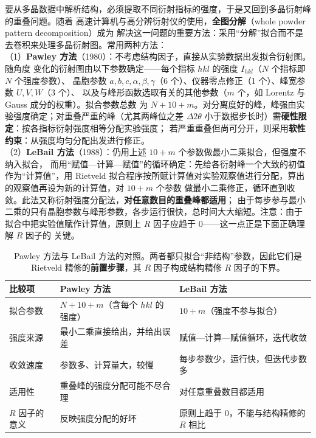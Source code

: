 \begin{principle}
要从多晶数据中解析结构，必须提取不同衍射指标的强度，于是又回到多晶衍射峰的重叠问题。随着
高速计算机与高分辨衍射仪的使用，\textbf{全图分解}（whole powder pattern decomposition）成为
解决这一问题的重要方法：采用``分解''拟合而不是去卷积来处理多晶衍射图。常用两种方法：\\
（1）\textbf{Pawley 方法}（1980）：不考虑结构因子，直接从实验数据出发拟合衍射图。随角度
变化的衍射图由以下参数确定——每个指标 $hkl$ 的强度 $I_{hkl}$（$N$ 个指标即 $N$ 个强度参数）、
晶胞参数 $a,b,c,\alpha,\beta,\gamma$（6 个）、仪器零点修正（1 个）、峰宽参数 $U,V,W$（3 个）、
以及与峰形函数选取有关的其他参数（$m$ 个，如 Lorentz 与 Gauss 成分的权重）。拟合参数总数
为 $N+10+m$。对分离度好的峰，峰强由实验强度确定；对重叠严重的峰（尤其两峰位之差
$\Delta2\theta$ 小于数据步长时）需\textbf{硬性限定}：按各指标衍射强度相等分配实验强度；
若严重重叠但尚可分开，则采用\textbf{软性约束}：从强度均匀分配出发进行修正。\\
（2）\textbf{LeBail 方法}（1988）：仍用上述 $10+m$ 个参数做最小二乘拟合，但强度不纳入拟合，
而用``赋值—计算—赋值''的循环确定：先给各衍射峰一个大致的初值作为``计算值''，用 Rietveld
拟合程序按所赋计算值对实验观察值进行分配，算出的观察值再设为新的计算值，对 $10+m$ 个参数
做最小二乘修正，循环直到收敛。此法又称衍射强度分配法，\textbf{对任意数目的重叠峰都适用}；
由于每步参与最小二乘的只有晶胞参数与峰形参数，各步运行很快，总时间大大缩短。注意：由于
拟合中把实验值赋作计算值，原则上 $R$ 因子应趋于 $0$——这一点正是下面正确理解 $R$ 因子的
关键。
\end{principle}

\begin{table}[tbp]
  \centering
  \caption{Pawley 方法与 LeBail 方法的对照。两者都只拟合``非结构''参数，因此它们是
    Rietveld 精修的\textbf{前置步骤}，其 $R$ 因子构成结构精修 $R$ 因子的下界。}
  \label{tab:ch04c-fitmethods}
  \begin{tabular}{@{}p{24mm}p{56mm}p{62mm}@{}}
    \toprule
    比较项 & Pawley 方法 & LeBail 方法 \\
    \midrule
    拟合参数 & $N+10+m$（含每个 $hkl$ 的强度） & $10+m$（强度不参与拟合） \\
    强度来源 & 最小二乘直接给出，并给出误差 & 赋值—计算—赋值循环，迭代收敛 \\
    收敛速度 & 参数多、计算量大，较慢 & 每步参数少，运行快，但迭代步数多 \\
    适用性 & 重叠峰的强度分配可能不尽合理 & 对任意重叠数目都适用 \\
    $R$ 因子的意义 & 反映强度分配的好坏 & 原则上趋于 $0$，不能与结构精修的 $R$ 相比 \\
    \bottomrule
  \end{tabular}
\end{table}

